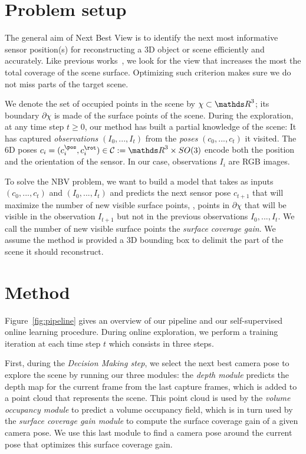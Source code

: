 \section{Problem setup}
\label{sec:problem_setup}


The general aim of Next Best View is to identify the next most informative sensor position(s) for reconstructing a 3D object or scene efficiently and accurately. Like previous works~\cite{guedon-nips22-scone-surface-coverage}, we look for the view that increases the most the total coverage of the scene surface. Optimizing such criterion makes sure we do not miss parts of the target scene.

We denote the set of occupied points in the scene by $\chi \subset \IR^3$; its boundary $\partial\chi$ is made of the surface points of the scene. During the exploration, at any time step $t\geq 0$, our method has built a partial knowledge of the scene: It has captured \emph{observations} $(I_0, ..., I_t)$ from the \emph{poses} $(c_0, ..., c_t)$ it visited. The 6D poses $c_i=(c_i^\pos, c_i^\rot)\in\calC:=\IR^3\times SO(3)$ encode both the position and the orientation of the sensor. In our case, observations $I_i$ are RGB images. 

To solve the NBV problem, we want to build a model that takes as inputs $(c_0, ..., c_t)$ and $(I_0,...,I_t)$ and predicts the next sensor pose $c_{t+1}$ that will maximize the number of new visible surface points, \ie, points in $\partial\chi$ that will be visible in the observation $I_{t+1}$ but not in the previous observations $I_0, ..., I_t$. We call the number of new visible surface points the \emph{surface coverage gain}. We assume the method is provided a 3D bounding box to delimit the part of the scene it should reconstruct.

\section{Method}
\label{sec:method}

Figure~\ref{fig:pipeline} gives an overview of our pipeline and our self-supervised online learning procedure. During online exploration, we perform a training iteration at each time step $t$ which consists in three steps. 

First, during the \emph{Decision Making step}, 
we select the next best camera pose to explore the scene by running our three modules:  the \emph{depth module} predicts the depth map for the current frame from the last capture frames, which is added to a point cloud that represents the scene. This point cloud is used by the \emph{volume occupancy module} to predict a volume occupancy field, which is in turn used by the \emph{surface coverage gain module} to compute the surface coverage gain of a given camera pose. We use this last module to find a camera pose around the current pose that optimizes this surface coverage gain. 

